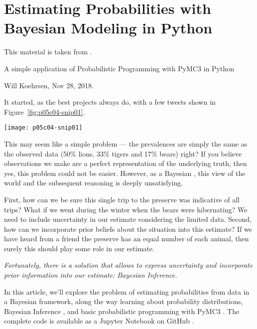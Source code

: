 
\chapter{Estimating Probabilities with Bayesian Modeling in Python}
\label{chap:EstimatingProbabilitieswithBayesianModelinginPython}


This material is taken from \cite{KoehrsenEstiBayes2018}.

A simple application of Probabilistic Programming with PyMC3 in Python

Will Koehrsen, Nov 28, 2018.

It started, as the best projects always do, with a few tweets shown in Figure~\ref{fig:p05c04-snip01}.


\begin{figure*}[h]
    \texttt{[image: p05c04-snip01]}
    \caption{Allen Downey tweets}
    \label{fig:p05c04-snip01}
    \end{figure*}


This may seem like a simple problem --- the prevalences are simply the same as the observed data (50\% lions, 33\% tigers and 17\% bears) right? If you believe observations we make are a perfect representation of the underlying truth, then yes, this problem could not be easier. However, as a Bayesian \cite{RationalWikiBayesian2019}, this view of the world and the subsequent reasoning is deeply unsatisfying.

First, how can we be sure this single trip to the preserve was indicative of all trips? What if we went during the winter when the bears were hibernating? We need to include uncertainty in our estimate considering the limited data. Second, how can we incorporate prior beliefs about the situation into this estimate? If we have heard from a friend the preserve has an equal number of each animal, then surely this should play some role in our estimate.

\textit{Fortunately, there is a solution that allows to express uncertainty and incorporate prior information into our estimate: Bayesian Inference.}

In this article, we'll explore the problem of estimating probabilities from data in a Bayesian framework, along the way learning about probability distributions, 
Bayesian Inference \cite{wikipediaBayesianinference2019}, and 
basic probabilistic programming \cite{CameronDavidsonPilonGitHub2019} \cite{CameronDavidsonPilonBlog2019} 
with PyMC3 \cite{PyMC3API2019}. The complete code is available as a Jupyter Notebook on GitHub \cite{KoehrsenEstiBayesGithub2018}.


